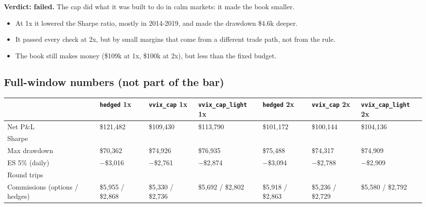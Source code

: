 \documentclass{article}
\begin{document}
\textbf{Verdict: failed.} The cap did what it was built to do in calm markets: it made the book smaller.

\begin{itemize}

\item At 1x it lowered the Sharpe ratio, mostly in 2014-2019, and made the drawdown \$4.6k deeper.

\item It passed every check at 2x, but by small margins that come from a different trade path, not from the rule.

\item The book still makes money (\$109k at 1x, \$100k at 2x), but less than the fixed budget.

\end{itemize}

\subsection{Full-window numbers (not part of the bar)}

\begin{center}\small
\begin{tabularx}{\linewidth}{>{\raggedright\arraybackslash}X >{\raggedright\arraybackslash}X >{\raggedright\arraybackslash}X >{\raggedright\arraybackslash}X >{\raggedright\arraybackslash}X >{\raggedright\arraybackslash}X >{\raggedright\arraybackslash}X}
\toprule
\textbf{} & \textbf{\texttt{hedged} 1x} & \textbf{\texttt{vvix\_\allowbreak{}cap} 1x} & \textbf{\texttt{vvix\_\allowbreak{}cap\_\allowbreak{}light} 1x} & \textbf{\texttt{hedged} 2x} & \textbf{\texttt{vvix\_\allowbreak{}cap} 2x} & \textbf{\texttt{vvix\_\allowbreak{}cap\_\allowbreak{}light} 2x} \\
\midrule
Net P\&L & \$121,482 & \$109,430 & \$113,790 & \$101,172 & \$100,144 & \$104,136 \\
Sharpe & 0.52 & 0.48 & 0.49 & 0.43 & 0.44 & 0.45 \\
Max drawdown & \$70,362 & \$74,926 & \$76,935 & \$75,488 & \$74,317 & \$74,909 \\
ES 5\% (daily) & \ensuremath{-}\$3,016 & \ensuremath{-}\$2,761 & \ensuremath{-}\$2,874 & \ensuremath{-}\$3,094 & \ensuremath{-}\$2,788 & \ensuremath{-}\$2,909 \\
Round trips & 182 & 182 & 184 & 181 & 180 & 181 \\
Commissions (options /\allowbreak{} hedges) & \$5,955 /\allowbreak{} \$2,868 & \$5,330 /\allowbreak{} \$2,736 & \$5,692 /\allowbreak{} \$2,802 & \$5,918 /\allowbreak{} \$2,863 & \$5,236 /\allowbreak{} \$2,729 & \$5,580 /\allowbreak{} \$2,792 \\
\bottomrule
\end{tabularx}
\end{center}
\end{document}
